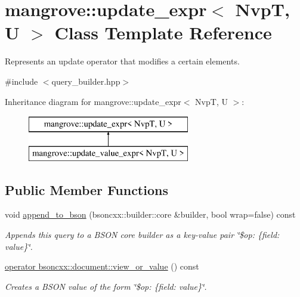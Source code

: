 \hypertarget{classmangrove_1_1update__expr}{}\section{mangrove\+:\+:update\+\_\+expr$<$ NvpT, U $>$ Class Template Reference}
\label{classmangrove_1_1update__expr}


Represents an update operator that modifies a certain elements.  




{\ttfamily \#include $<$query\+\_\+builder.\+hpp$>$}

Inheritance diagram for mangrove\+:\+:update\+\_\+expr$<$ NvpT, U $>$\+:\begin{figure}[H]
\begin{center}
\leavevmode
\includegraphics[height=2.000000cm]{classmangrove_1_1update__expr}
\end{center}
\end{figure}
\subsection*{Public Member Functions}
\begin{DoxyCompactItemize}
\item 
void \hyperlink{classmangrove_1_1update__expr_a49e2499eafc550fa1cc536821096d807}{append\+\_\+to\+\_\+bson} (bsoncxx\+::builder\+::core \&builder, bool wrap=false) const 
\begin{DoxyCompactList}\small\item\em Appends this query to a B\+S\+ON core builder as a key-\/value pair \char`\"{}\$op\+: \{field\+: value\}\char`\"{}. \end{DoxyCompactList}\item 
\hyperlink{classmangrove_1_1update__expr_ae2373cfc8120b48cf144f239b034706f}{operator bsoncxx\+::document\+::view\+\_\+or\+\_\+value} () const \hypertarget{classmangrove_1_1update__expr_ae2373cfc8120b48cf144f239b034706f}{}\label{classmangrove_1_1update__expr_ae2373cfc8120b48cf144f239b034706f}

\begin{DoxyCompactList}\small\item\em Creates a B\+S\+ON value of the form \char`\"{}\$op\+: \{field\+: value\}\char`\"{}. \end{DoxyCompactList}\end{DoxyCompactItemize}


